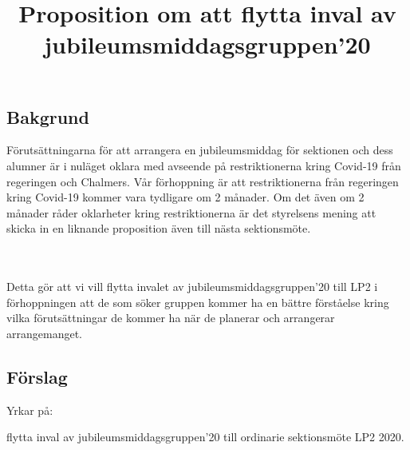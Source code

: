 \documentclass[11pt, noincludeaddress, nopagination]{classes/cthit}
\begin{document}
\title{Proposition om att flytta inval av jubileumsmiddagsgruppen'20}

\makeheadfoot%

\makesimpletitle

\subsection*{Bakgrund}
Förutsättningarna för att arrangera en jubileumsmiddag för sektionen och dess alumner är i nuläget oklara med avseende på restriktionerna kring Covid-19 från regeringen och Chalmers. 
Vår förhoppning är att restriktionerna från regeringen kring Covid-19 kommer vara tydligare om 2 månader.
Om det även om 2 månader råder oklarheter kring restriktionerna är det styrelsens mening att skicka in en liknande proposition även till nästa sektionsmöte. 

\\\\
Detta gör att vi vill flytta invalet av jubileumsmiddagsgruppen'20 till LP2 i förhoppningen att de som söker gruppen kommer ha en bättre förståelse kring vilka förutsättningar de kommer ha när de planerar och arrangerar arrangemanget. 

\subsection*{Förslag}
Yrkar på:
\begin{att}
	\item flytta inval av jubileumsmiddagsgruppen'20 till ordinarie sektionsmöte LP2 2020. 

\end{att}
\end{document}
